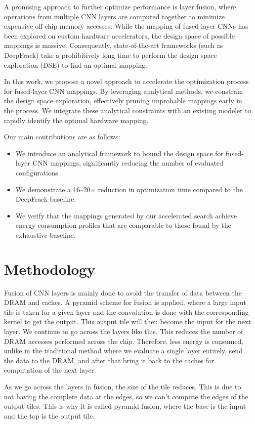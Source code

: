 \documentclass[conference]{IEEEtran}
\begin{document}
A promising approach to further optimize performance is layer fusion, where operations from multiple CNN layers are computed together to minimize expensive off-chip memory accesses. While the mapping of fused-layer CNNs has been explored on custom hardware accelerators, the design space of possible mappings is massive. Consequently, state-of-the-art frameworks (such as DeepFrack) take a prohibitively long time to perform the design space exploration (DSE) to find an optimal mapping. 

In this work, we propose a novel approach to accelerate the optimization process for fused-layer CNN mappings. By leveraging analytical methods, we constrain the design space exploration, effectively pruning improbable mappings early in the process. We integrate these analytical constraints with an existing modeler to rapidly identify the optimal hardware mapping. 

Our main contributions are as follows:
\begin{itemize}
    \item We introduce an analytical framework to bound the design space for fused-layer CNN mappings, significantly reducing the number of evaluated configurations.
    \item We demonstrate a 16--20$\times$ reduction in optimization time compared to the DeepFrack baseline.
    \item We verify that the mappings generated by our accelerated search achieve energy consumption profiles that are comparable to those found by the exhaustive baseline.
\end{itemize}


\section{Methodology}
Fusion of CNN layers is mainly done to avoid the transfer of data between the DRAM and caches. A pyramid scheme for fusion is applied, where a large input tile is taken for a given layer and the convolution is done with the corresponding kernel to get the output. This output tile will then become the input for the next layer. We continue to go across the layers like this. This reduces the number of DRAM accesses performed across the chip. Therefore, less energy is consumed, unlike in the traditional method where we evaluate a single layer entirely, send the data to the DRAM, and after that bring it back to the caches for computation of the next layer.

As we go across the layers in fusion, the size of the tile reduces. This is due to not having the complete data at the edges, so we can't compute the edges of the output tiles. This is why it is called pyramid fusion, where the base is the input and the top is the output tile.
\end{document}
